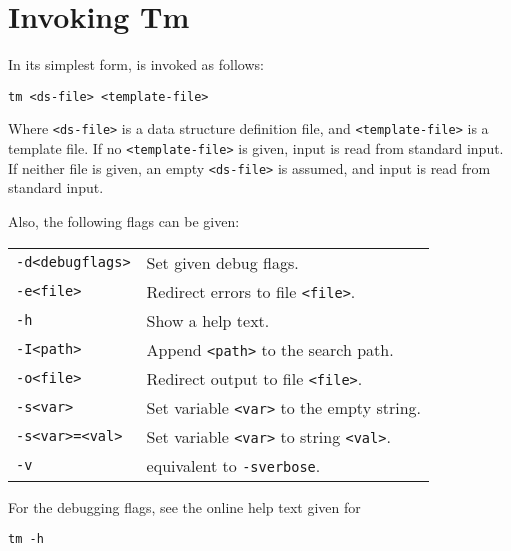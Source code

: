 \chapter{Invoking Tm}
\label{s.command}
In its simplest form, {\Tm} is invoked as follows:
\begin{verbatim}
tm <ds-file> <template-file>
\end{verbatim}
Where \verb'<ds-file>' is a data structure definition file, and
\verb'<template-file>' is a template file.
If no \verb'<template-file>' is given, input is read from standard input.
If neither file is given, an empty \verb'<ds-file>' is assumed, and
input is read from standard input.
\par
Also, the following flags can be given:

\begin{flushleft}
\begin{tabular}{ll}
\verb'-d<debugflags>'  & Set given debug flags. \\
\verb'-e<file>'        & Redirect errors to file \verb'<file>'. \\
\verb'-h'              & Show a help text. \\
\verb'-I<path>'        & Append \verb'<path>' to the search path. \\
\verb'-o<file>'        & Redirect output to file \verb'<file>'. \\
\verb'-s<var>'         & Set variable \verb'<var>' to the empty string. \\
\verb'-s<var>=<val>'   & Set variable \verb'<var>' to string \verb'<val>'. \\
\verb'-v'              & equivalent to \verb'-sverbose'. \\
\end{tabular}
\end{flushleft}

For the debugging flags, see the online help text given for
\begin{verbatim}
tm -h
\end{verbatim}
